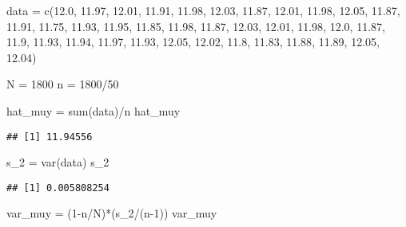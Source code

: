\documentclass[
]{article}
\newenvironment{Shaded}{\begin{snugshade}}{\end{snugshade}}
\newcommand{\DecValTok}[1]{\textcolor[rgb]{0.00,0.00,0.81}{#1}}
\newcommand{\FloatTok}[1]{\textcolor[rgb]{0.00,0.00,0.81}{#1}}
\newcommand{\FunctionTok}[1]{\textcolor[rgb]{0.00,0.00,0.00}{#1}}
\newcommand{\NormalTok}[1]{#1}
\newcommand{\OtherTok}[1]{\textcolor[rgb]{0.56,0.35,0.01}{#1}}
\newcommand{\SpecialCharTok}[1]{\textcolor[rgb]{0.00,0.00,0.00}{#1}}
\begin{document}
\begin{Shaded}
\begin{Highlighting}[]
\NormalTok{data }\OtherTok{=} \FunctionTok{c}\NormalTok{(}\FloatTok{12.0}\NormalTok{, }\FloatTok{11.97}\NormalTok{, }\FloatTok{12.01}\NormalTok{, }\FloatTok{11.91}\NormalTok{, }\FloatTok{11.98}\NormalTok{, }\FloatTok{12.03}\NormalTok{, }\FloatTok{11.87}\NormalTok{, }\FloatTok{12.01}\NormalTok{, }\FloatTok{11.98}\NormalTok{, }\FloatTok{12.05}\NormalTok{, }\FloatTok{11.87}\NormalTok{, }\FloatTok{11.91}\NormalTok{, }\FloatTok{11.75}\NormalTok{, }\FloatTok{11.93}\NormalTok{, }\FloatTok{11.95}\NormalTok{, }\FloatTok{11.85}\NormalTok{, }\FloatTok{11.98}\NormalTok{, }\FloatTok{11.87}\NormalTok{, }\FloatTok{12.03}\NormalTok{, }\FloatTok{12.01}\NormalTok{, }\FloatTok{11.98}\NormalTok{, }\FloatTok{12.0}\NormalTok{, }\FloatTok{11.87}\NormalTok{, }\FloatTok{11.9}\NormalTok{, }\FloatTok{11.93}\NormalTok{, }\FloatTok{11.94}\NormalTok{, }\FloatTok{11.97}\NormalTok{, }\FloatTok{11.93}\NormalTok{, }\FloatTok{12.05}\NormalTok{, }\FloatTok{12.02}\NormalTok{, }\FloatTok{11.8}\NormalTok{, }\FloatTok{11.83}\NormalTok{, }\FloatTok{11.88}\NormalTok{, }\FloatTok{11.89}\NormalTok{, }\FloatTok{12.05}\NormalTok{, }\FloatTok{12.04}\NormalTok{)}

\NormalTok{N }\OtherTok{=} \DecValTok{1800}
\NormalTok{n }\OtherTok{=} \DecValTok{1800}\SpecialCharTok{/}\DecValTok{50}

\NormalTok{hat\_muy }\OtherTok{=} \FunctionTok{sum}\NormalTok{(data)}\SpecialCharTok{/}\NormalTok{n}
\NormalTok{hat\_muy}
\end{Highlighting}
\end{Shaded}

\begin{verbatim}
## [1] 11.94556
\end{verbatim}

\begin{Shaded}
\begin{Highlighting}[]
\NormalTok{s\_2 }\OtherTok{=} \FunctionTok{var}\NormalTok{(data)}
\NormalTok{s\_2}
\end{Highlighting}
\end{Shaded}

\begin{verbatim}
## [1] 0.005808254
\end{verbatim}

\begin{Shaded}
\begin{Highlighting}[]
\NormalTok{var\_muy }\OtherTok{=}\NormalTok{ (}\DecValTok{1}\SpecialCharTok{{-}}\NormalTok{n}\SpecialCharTok{/}\NormalTok{N)}\SpecialCharTok{*}\NormalTok{(s\_2}\SpecialCharTok{/}\NormalTok{(n}\DecValTok{{-}1}\NormalTok{))}
\NormalTok{var\_muy}
\end{Highlighting}
\end{Shaded}
\end{document}
